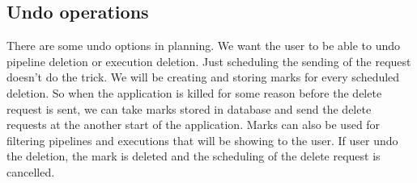 \subsection{Undo operations}
There are some undo options in planning.
We want the user to be able to undo pipeline deletion or execution deletion.
Just scheduling the sending of the request doesn't do the trick.
We will be creating and storing marks for every scheduled deletion.
So when the application is killed for some reason before the delete request is sent, we can take marks stored in database and send the delete requests at the another start of the application.
Marks can also be used for filtering pipelines and executions that will be showing to the user.
If user undo the deletion, the mark is deleted and the scheduling of the delete request is cancelled.

